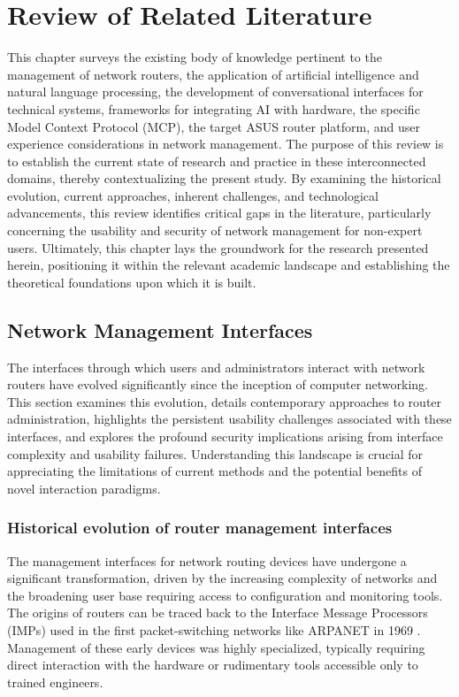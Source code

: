 \chapter{Review of Related Literature}
\label{chap:compiling}

This chapter surveys the existing body of knowledge pertinent to the management of network routers, the application of artificial intelligence and natural language processing, the development of conversational interfaces for technical systems, frameworks for integrating AI with hardware, the specific Model Context Protocol (MCP), the target ASUS router platform, and user experience considerations in network management. The purpose of this review is to establish the current state of research and practice in these interconnected domains, thereby contextualizing the present study. By examining the historical evolution, current approaches, inherent challenges, and technological advancements, this review identifies critical gaps in the literature, particularly concerning the usability and security of network management for non-expert users. Ultimately, this chapter lays the groundwork for the research presented herein, positioning it within the relevant academic landscape and establishing the theoretical foundations upon which it is built.

\section{Network Management Interfaces}
The interfaces through which users and administrators interact with network routers have evolved significantly since the inception of computer networking. This section examines this evolution, details contemporary approaches to router administration, highlights the persistent usability challenges associated with these interfaces, and explores the profound security implications arising from interface complexity and usability failures. Understanding this landscape is crucial for appreciating the limitations of current methods and the potential benefits of novel interaction paradigms.

\subsection{Historical evolution of router management interfaces}
The management interfaces for network routing devices have undergone a significant transformation, driven by the increasing complexity of networks and the broadening user base requiring access to configuration and monitoring tools. The origins of routers can be traced back to the Interface Message Processors (IMPs) used in the first packet-switching networks like ARPANET in 1969 \cite{smarthome_evolution}. Management of these early devices was highly specialized, typically requiring direct interaction with the hardware or rudimentary tools accessible only to trained engineers.

